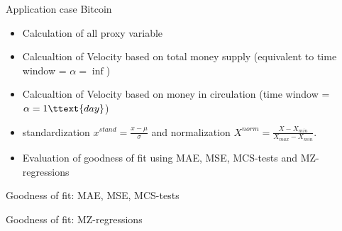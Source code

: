 \documentclass[]{beamer}
\begin{document}
\begin{frame}{Application case Bitcoin}
  \begin{itemize}
  \item Calculation of all proxy variable
  \item Calcualtion of Velocity based on total money supply (equivalent to time window = \(\alpha = \inf\))
  \item Calcualtion of Velocity based on money in circulation (time window = \(\alpha = 1 \ttext{ day}\))
  \item standardization $x^{stand} = \frac{x-\mu}{\sigma}$ and normalization $X^{norm} = \frac{X-X_{min}}{X_{max}-X_{min}}$.
  \item Evaluation of goodness of fit using MAE, MSE, MCS-tests and MZ-regressions
  \end{itemize}
\end{frame}





\begin{frame}{Goodness of fit: MAE, MSE, MCS-tests}
  
  \begin{center}
    \begin{table}
      \caption{Mean absolute error for normalized data of %
        approximation methods compared to estimation methods. Approximators in %
        5\%-Model confidence set marked by \(\dag\) and %
        in 1\%-Model confidence set marked by \(\ddag\).}
      \label{tbl: errortable1}
    \end{table}
    \vspace{-4mm}
  \end{center}

\end{frame}


\begin{frame}{Goodness of fit: MZ-regressions}
  
  \begin{center}
    \begin{table}
      \caption{Minzer-Zarnowitz regressions for standardized and %
        normalized approximation and estimation data.}
      \label{tbl: errortable2}
    \end{table}
    \vspace{-4mm}
  \end{center}

\end{frame}
\end{document}

